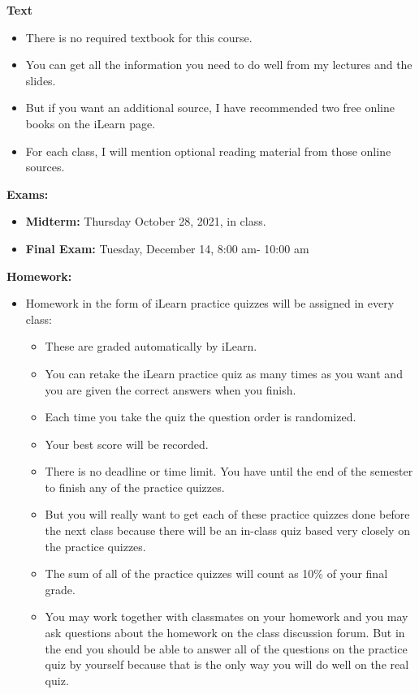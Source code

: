 \documentclass[oneside,12pt]{amsart}
\begin{document}
\bigskip

\textbf{Text}
\begin{itemize}
\item There is no required textbook for this course.
\item You can get all the information you need to do well from my lectures and the slides.
\item But if you want an additional source, I have recommended two free online books on the iLearn page.
\item For each class, I will mention optional reading material from those online sources.
\end{itemize}

\bigskip

\textbf{Exams:}
\begin{itemize}
\item \textbf{Midterm:} Thursday October 28, 2021, in class.
\item \textbf{Final Exam:} Tuesday, December 14, 8:00 am- 10:00 am
\end{itemize}

\bigskip

\textbf{Homework:}
\begin{itemize}
\item Homework in the form of iLearn practice quizzes will be assigned in every class:
  \begin{itemize}
    \item These are graded automatically by iLearn.
    \item You can retake the iLearn practice quiz as many times as you want and you are given the correct answers when you finish.
    \item Each time you take the quiz the question order is randomized.
    \item Your best score will be recorded.
    \item There is no deadline or time limit. You have until the end of the semester to finish any of the practice quizzes.
    \item But you will really want to get each of these practice quizzes done before the next class because there will
    be an in-class quiz based very closely on the practice quizzes.
    \item The sum of all of the practice quizzes will count as 10\% of your final grade.
    \item You may work together with classmates on your homework and you may ask questions about the homework on the
    class discussion forum. But in the end you should be able to answer all of the questions on the practice quiz
    by yourself because that is the only way you will do well on the real quiz.
  \end{itemize}
\end{itemize}
\end{document}
